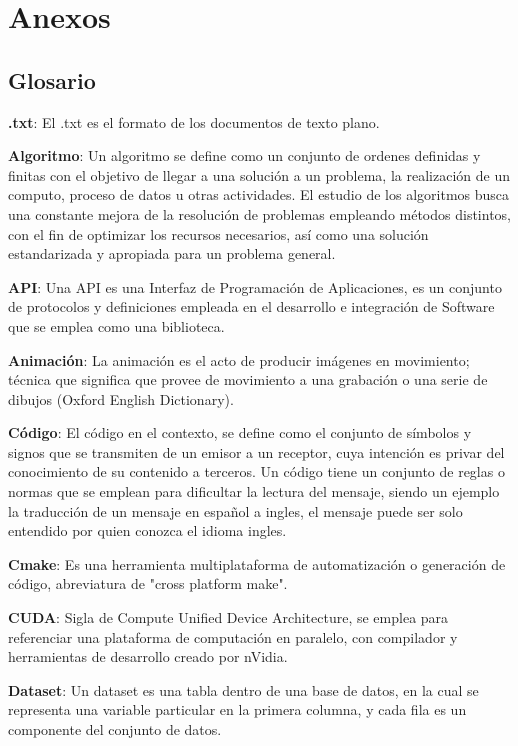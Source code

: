 \chapter{Anexos}

\section{Glosario}

\textbf{.txt}: El .txt es el formato de los documentos de texto plano.

\textbf{Algoritmo}: Un algoritmo se define como un conjunto de ordenes definidas y finitas con el objetivo de llegar a una solución a un problema, la realización de un computo, proceso de datos u otras actividades. El estudio de los algoritmos busca una constante mejora de la resolución de problemas empleando métodos distintos, con el fin de optimizar los recursos necesarios, así como una solución estandarizada y apropiada para un problema general.

\textbf{API}: Una API es una Interfaz de Programación de Aplicaciones, es un conjunto de protocolos y definiciones empleada en el desarrollo e integración de Software que se emplea como una biblioteca.

\textbf{Animación}: La animación es el acto de producir imágenes en movimiento; técnica que significa que provee de movimiento a una grabación o una serie de dibujos (Oxford English Dictionary). 

\textbf{Código}: El código en el contexto, se define como el conjunto de símbolos y signos que se transmiten de un emisor a un receptor, cuya intención es privar del conocimiento de su contenido a terceros. Un código tiene un conjunto de reglas o normas que se emplean para dificultar la lectura del mensaje, siendo un ejemplo la traducción de un mensaje en español a ingles, el mensaje puede ser solo entendido por quien conozca el idioma ingles.

\textbf{Cmake}: Es una herramienta multiplataforma de automatización o generación de código, abreviatura de "cross platform make".

\textbf{CUDA}: Sigla de Compute Unified Device Architecture, se emplea para referenciar una plataforma de computación en paralelo, con compilador y herramientas de desarrollo creado por nVidia.

\textbf{Dataset}: Un dataset es una tabla dentro de una base de datos, en la cual se representa una variable particular en la primera columna, y cada fila es un componente del conjunto de datos.

